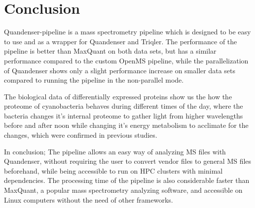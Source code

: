 \section{Conclusion}

Quandenser-pipeline is a mass spectrometry pipeline which is designed to be easy to use and as a wrapper for Quandenser and Triqler. The performance of the pipeline is better than MaxQuant on both data sets, but has a similar performance compared to the custom OpenMS pipeline, while the parallelization of Quandenser shows only a slight performance increase on smaller data sets compared to running the pipeline in the non-parallel mode.

The biological data of differentially expressed proteins show us the how the proteome of cyanobacteria behaves during different times of the day, where the bacteria changes it's internal proteome to gather light from higher wavelengths before and after noon while changing it's energy metabolism to acclimate for the changes, which were confirmed in previous studies.

In conclusion; The pipeline allows an easy way of analyzing MS files with Quandenser, without requiring the user to convert vendor files to general MS files beforehand, while being accessible to run on HPC clusters with minimal dependencies. The processing time of the pipeline is also considerable faster than MaxQuant, a popular mass spectrometry analyzing software, and accessible on Linux computers without the need of other frameworks.
